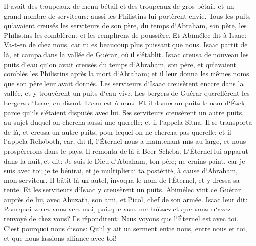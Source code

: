 \verse Il avait des troupeaux de menu bétail et des troupeaux de gros bétail, et un grand nombre de serviteurs: aussi les Philistins lui portèrent envie. 
\verse Tous les puits qu`avaient creusés les serviteurs de son père, du temps d`Abraham, son père, les Philistins les comblèrent et les remplirent de poussière. 
\verse Et Abimélec dit à Isaac: Va-t-en de chez nous, car tu es beaucoup plus puissant que nous. 
\verse Isaac partit de là, et campa dans la vallée de Guérar, où il s`établit. 
\verse Isaac creusa de nouveau les puits d`eau qu`on avait creusés du temps d`Abraham, son père, et qu`avaient comblés les Philistins après la mort d`Abraham; et il leur donna les mêmes noms que son père leur avait donnés. 
\verse Les serviteurs d`Isaac creusèrent encore dans la vallée, et y trouvèrent un puits d`eau vive. 
\verse Les bergers de Guérar querellèrent les bergers d`Isaac, en disant: L`eau est à nous. Et il donna au puits le nom d`Ések, parce qu`ils s`étaient disputés avec lui. 
\verse Ses serviteurs creusèrent un autre puits, au sujet duquel on chercha aussi une querelle; et il l`appela Sitna. 
\verse Il se transporta de là, et creusa un autre puits, pour lequel on ne chercha pas querelle; et il l`appela Rehoboth, car, dit-il, l`Éternel nous a maintenant mis au large, et nous prospérerons dans le pays. 
\verse Il remonta de là à Beer Schéba. 
\verse L`Éternel lui apparut dans la nuit, et dit: Je suis le Dieu d`Abraham, ton père; ne crains point, car je suis avec toi; je te bénirai, et je multiplierai ta postérité, à cause d`Abraham, mon serviteur. 
\verse Il bâtit là un autel, invoqua le nom de l`Éternel, et y dressa sa tente. Et les serviteurs d`Isaac y creusèrent un puits. 
\verse Abimélec vint de Guérar auprès de lui, avec Ahuzath, son ami, et Picol, chef de son armée. 
\verse Isaac leur dit: Pourquoi venez-vous vers moi, puisque vous me haïssez et que vous m`avez renvoyé de chez vous? 
\verse Ils répondirent: Nous voyons que l`Éternel est avec toi. C`est pourquoi nous disons: Qu`il y ait un serment entre nous, entre nous et toi, et que nous fassions alliance avec toi! 
